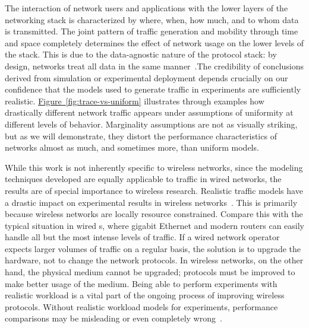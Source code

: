 \documentclass[twocolumn,final]{svjour3}
\newcommand{\caps}[1]{{\smaller{#1}}}
\newcommand{\Figure}[1]{\hyperref[fig:#1]{Figure~\ref*{fig:#1}}}
\begin{document}
The interaction of network users and applications with the lower layers of the networking stack is characterized by where, when, how much, and to whom data is transmitted. The joint pattern of traffic generation and mobility through time and space completely determines the effect of network usage on the lower levels of the stack. This is due to the data-agnostic nature of the protocol stack: by design, \caps{IP} networks treat all data in the same manner~\cite{Clark88}.\QoSnote The credibility of conclusions derived from simulation or experimental deployment depends crucially on our confidence that the models used to generate traffic in experiments are sufficiently realistic. \Figure{trace-vs-uniform} illustrates through examples how drastically different network traffic appears under assumptions of uniformity at different levels of behavior. Marginality assumptions are not as visually striking, but as we will demonstrate, they distort the performance characteristics of networks almost as much, and sometimes more, than uniform models.

While this work is not inherently specific to wireless networks, since the modeling techniques developed are equally applicable to traffic in wired networks, the results are of special importance to wireless research.
Realistic traffic models have a drastic impact on experimental results in wireless networks~\cite{Karpinski07:realism,Karpinski07:cbr-failure}.
This is primarily because wireless networks are locally resource constrained.
Compare this with the typical situation in wired \caps{LAN}s, where gigabit Ethernet and modern routers  can easily handle all but the most intense levels of traffic.
If a wired network operator expects larger volumes of traffic on a regular basis, the solution is to upgrade the hardware, not to change the network protocols.
In wireless networks, on the other hand, the physical medium cannot be upgraded; protocols must be improved to make better usage of the medium.
Being able to perform experiments with realistic workload is a vital part of the ongoing process of improving wireless protocols.
Without realistic workload models for experiments, performance comparisons may be misleading or even completely wrong~\cite{Karpinski07:cbr-failure}.
\end{document}
